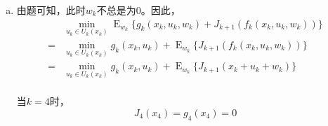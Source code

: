 \documentclass{article}
\begin{document}
    \begin{enumerate}[(c)]
        \item 由题可知，此时$w_k$不总是为0。因此，
        \begin{equation}
            \begin{split}
                &\min_{u_k\in U_k(x_k)}\mathop{E}_{w_k}\big\{g_k(x_k,u_k,w_k)+J_{k+1}(f_k(x_k, u_k, w_k))\big\}\\
                =&\min_{u_k\in U_k(x_k)}g_k(x_k,u_k)+\mathop{E}_{w_k}\big\{J_{k+1}(f_k(x_k, u_k, w_k))\big\}\\
                =&\min_{u_k\in U_k(x_k)}g_k(x_k,u_k)+\mathop{E}_{w_k}\big\{J_{k+1}(x_k+u_k+w_k)\big\}\\
            \end{split}
        \end{equation}
        
        当$k=4$时，
        \begin{equation}
            J_4(x_4)=g_4(x_4)=0
        \end{equation}


\end{enumerate}
\end{document}
